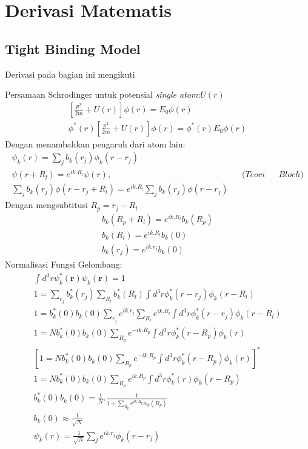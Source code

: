 \chapter{Derivasi Matematis}
\section{Tight Binding Model}
\label{sec:tbmodel}
Derivasi pada bagian ini mengikuti \parencite{mitocw2019tightbinding}
\par 
Persamaan Schrodinger untuk potensial \textit{single atom}:$U(r)$
\begin{align}
    \left[\frac{p^2}{2m} + U(r) \right]\phi(r)=E_0 \phi(r)
    \\ \phi^*(r)\left[\frac{p^2}{2m} + U(r) \right]\phi(r)=\phi^*(r)E_0\phi(r)
\end{align}
Dengan menambahkan pengaruh dari atom lain:
\begin{align}
    \psi_k(r)=\sum_j b_k(r_j) \phi_k(r-r_j) \\
    \psi(r+R_l)=e^{ik.R_l}\psi(r), && (Teori && Bloch)\\
    \sum_j b_k(r_j) \phi(r-r_j+R_l)=e^{ik.R_l}\sum_j b_k(r_j) \phi(r-r_j)
\end{align}
Dengan mengsubtitusi $R_p=r_j-R_l$
\begin{align}
    b_k(R_p+R_l)=e^{ik.R_l}b_k(R_p)
\\  b_k(R_l)=e^{ik.R_l}b_k(0)\\
 b_k(r_j)=e^{ik.r_j}b_k(0)
\end{align}
Normalisasi Fungsi Gelombang:
\begin{align}
    \int{d^3r\psi^*_k(\textbf{r})\psi_k(\textbf{r})}=1\\
    1=\sum_{r_j}b_k^*(r_j) \sum_{R_l}b_k^*(R_l)\int d^3r\phi^*_k(r-r_j)\phi_k(r-R_l)\\
    1=b_k^*(0)b_k(0)\sum_{r_j}e^{ik.r_j}\sum_{R_l}e^{ik.R_l}\int d^3r\phi^*_k(r-r_j)\phi_k(r-R_l)\\
    1=Nb_k^*(0)b_k(0)\sum_{R_p}e^{-ik.R_p}\int d^3r\phi^*_k(r-R_p)\phi_k(r)\\
    \left[1=Nb_k^*(0)b_k(0)\sum_{R_p}e^{-ik.R_p}\int d^3r\phi^*_k(r-R_p)\phi_k(r)\right]^*\\
    1=Nb_k^*(0)b_k(0)\sum_{R_p}e^{ik.R_p}\int d^3r\phi^*_k(r)\phi_k(r-R_p)
    \\
    b_k^*(0)b_k(0)=\frac{1}{N}.\frac{1}{1+\sum_{R_p}e^{ik.R_p}\alpha_k(R_p)}
    \\ b_k(0) \approx \frac{1}{\sqrt{N}}
    \\ \psi_k(r)=\frac{1}{\sqrt{N}}\sum_j e^{ik.r_j} \phi_k(r-r_j)
\end{align}
